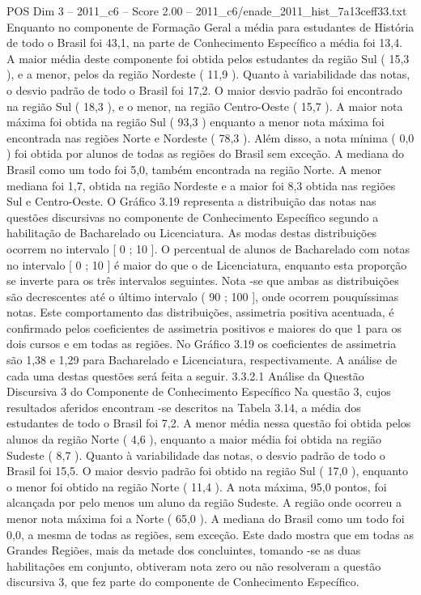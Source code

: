 \begin{textsample}{POS Dim 3 – 2011\_c6 – Score 2.00 – 2011\_c6/enade\_2011\_hist\_7a13ceff33.txt}
Enquanto no componente de Formação Geral a média para estudantes de História de todo o Brasil foi 43,1, na parte de Conhecimento Específico a média foi 13,4.
A maior média deste componente foi obtida pelos estudantes da região Sul ( 15,3 ), e a menor, pelos da região Nordeste ( 11,9 ).
Quanto à variabilidade das notas, o desvio padrão de todo o Brasil foi 17,2.
O maior desvio padrão foi encontrado na região Sul ( 18,3 ), e o menor, na região Centro-Oeste ( 15,7 ).
A maior nota máxima foi obtida na região Sul ( 93,3 ) enquanto a menor nota máxima foi encontrada nas regiões Norte e Nordeste ( 78,3 ).
Além disso, a nota mínima ( 0,0 ) foi obtida por alunos de todas as regiões do Brasil sem exceção.
A mediana do Brasil como um todo foi 5,0, também encontrada na região Norte.
A menor mediana foi 1,7, obtida na região Nordeste e a maior foi 8,3 obtida nas regiões Sul e Centro-Oeste.
O Gráfico 3.19 representa a distribuição das notas nas questões discursivas no componente de Conhecimento Específico segundo a habilitação de Bacharelado ou Licenciatura.
As modas destas distribuições ocorrem no intervalo [ 0 ; 10 ].
O percentual de alunos de Bacharelado com notas no intervalo [ 0 ; 10 ] é maior do que o de Licenciatura, enquanto esta proporção se inverte para os três intervalos seguintes.
Nota -se que ambas as distribuições são decrescentes até o último intervalo ( 90 ; 100 ], onde ocorrem pouquíssimas notas.
Este comportamento das distribuições, assimetria positiva acentuada, é confirmado pelos coeficientes de assimetria positivos e maiores do que 1 para os dois cursos e em todas as regiões.
No Gráfico 3.19 os coeficientes de assimetria são 1,38 e 1,29 para Bacharelado e Licenciatura, respectivamente.
A análise de cada uma destas questões será feita a seguir. 3.3.2.1 Análise da Questão Discursiva 3 do Componente de Conhecimento Específico Na questão 3, cujos resultados aferidos encontram -se descritos na Tabela 3.14, a média dos estudantes de todo o Brasil foi 7,2.
A menor média nessa questão foi obtida pelos alunos da região Norte ( 4,6 ), enquanto a maior média foi obtida na região Sudeste ( 8,7 ).
Quanto à variabilidade das notas, o desvio padrão de todo o Brasil foi 15,5.
O maior desvio padrão foi obtido na região Sul ( 17,0 ), enquanto o menor foi obtido na região Norte ( 11,4 ).
A nota máxima, 95,0 pontos, foi alcançada por pelo menos um aluno da região Sudeste.
A região onde ocorreu a menor nota máxima foi a Norte ( 65,0 ).
A mediana do Brasil como um todo foi 0,0, a mesma de todas as regiões, sem exceção.
Este dado mostra que em todas as Grandes Regiões, mais da metade dos concluintes, tomando -se as duas habilitações em conjunto, obtiveram nota zero ou não resolveram a questão discursiva 3, que fez parte do componente de Conhecimento Específico.

\end{textsample}
